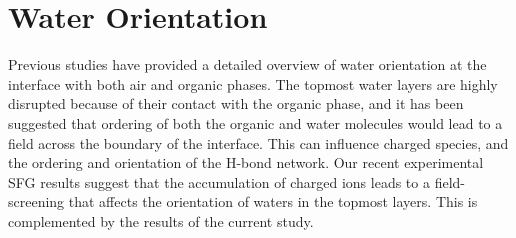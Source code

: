 \section{Water Orientation}

Previous studies have provided a detailed overview of water orientation at the interface with both air and organic phases.\cite{McFearin2009,Hore2008,Fan2009,Wick2006c,Wick2008a} The topmost water layers are highly disrupted because of their contact with the organic phase, and it has been suggested that ordering of both the organic and water molecules would lead to a field across the boundary of the interface.\cite{McFearin2009,Hore2008} This can influence charged species, and the ordering and orientation of the H-bond network. Our recent experimental SFG results suggest that the accumulation of charged ions leads to a field-screening that affects the orientation of waters in the topmost layers. This is complemented by the results of the current study.

